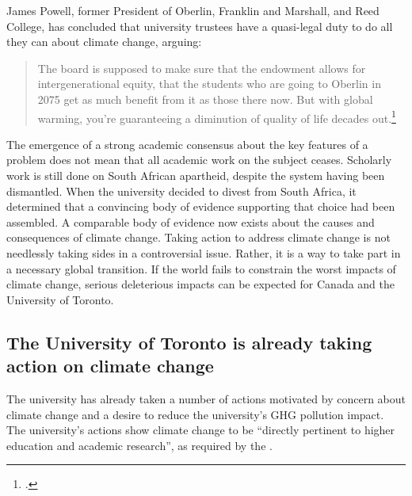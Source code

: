 \documentclass[10pt]{article}
\begin{document}



James Powell, former President of Oberlin, Franklin and Marshall, and Reed College, has concluded that university trustees have a quasi-legal duty to do all they can about climate change, arguing:
\begin{quote}
The board is supposed to make sure that the endowment allows for intergenerational equity, that the students who are going to Oberlin in 2075 get as much benefit from it as those there now. But with global warming, you’re guaranteeing a diminution of quality of life decades out.\footcite[][]{CaseForDivestment}
\end{quote}
The emergence of a strong academic consensus about the key features of a problem does not mean that all academic work on the subject ceases.
Scholarly work is still done on South African apartheid, despite the system having been dismantled.
When the university decided to divest from South Africa, it determined that a convincing body of evidence supporting that choice had been assembled.
A comparable body of evidence now exists about the causes and consequences of climate change.
Taking action to address climate change is not needlessly taking sides in a controversial issue. 
Rather, it is a way to take part in a necessary global transition. 
If the world fails to constrain the worst impacts of climate change, serious deleterious impacts can be expected for Canada and the University of Toronto.



	\subsection{The University of Toronto is already taking action on climate change}
	\label{UTTakenSides}



The university has already taken a number of actions motivated by concern about climate change and a desire to reduce the university's GHG pollution impact.
The university's actions show climate change to be ``directly pertinent to higher education and academic research'', as required by the .
\end{document}
